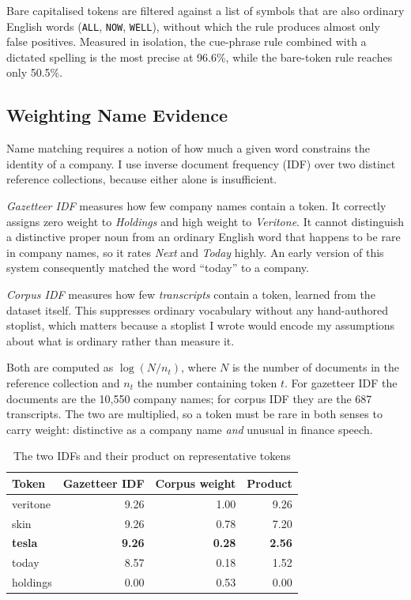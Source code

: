 \documentclass[conference]{IEEEtran}
\begin{document}
Bare capitalised tokens are filtered against a list of symbols that are also
ordinary English words (\texttt{ALL}, \texttt{NOW}, \texttt{WELL}), without
which the rule produces almost only false positives. Measured in isolation, the
cue-phrase rule combined with a dictated spelling is the most precise at 96.6\%,
while the bare-token rule reaches only 50.5\%.

\subsection{Weighting Name Evidence}

Name matching requires a notion of how much a given word constrains the identity
of a company. I use inverse document frequency (IDF) over two distinct reference
collections, because either alone is insufficient.

\emph{Gazetteer IDF} measures how few company names contain a token. It
correctly assigns zero weight to \emph{Holdings} and high weight to
\emph{Veritone}. It cannot distinguish a distinctive proper noun from an
ordinary English word that happens to be rare in company names, so it rates
\emph{Next} and \emph{Today} highly. An early version of this system
consequently matched the word ``today'' to a company.

\emph{Corpus IDF} measures how few \emph{transcripts} contain a token, learned
from the dataset itself. This suppresses ordinary vocabulary without any
hand-authored stoplist, which matters because a stoplist I wrote would encode
my assumptions about what is ordinary rather than measure it.

Both are computed as $\log(N / n_t)$, where $N$ is the number of documents in
the reference collection and $n_t$ the number containing token $t$. For
gazetteer IDF the documents are the 10{,}550 company names; for corpus IDF they
are the 687 transcripts. The two are multiplied, so a token must be rare in both
senses to carry weight: distinctive as a company name \emph{and} unusual in
finance speech.

\begin{table}[htbp]
\caption{The two IDFs and their product on representative tokens}
\label{tab:idf}
\centering
\begin{tabular}{lrrr}
\toprule
Token & Gazetteer IDF & Corpus weight & Product \\
\midrule
veritone & 9.26 & 1.00 & 9.26 \\
skin & 9.26 & 0.78 & 7.20 \\
\textbf{tesla} & \textbf{9.26} & \textbf{0.28} & \textbf{2.56} \\
today & 8.57 & 0.18 & 1.52 \\
holdings & 0.00 & 0.53 & 0.00 \\
\bottomrule
\end{tabular}
\end{table}
\end{document}
